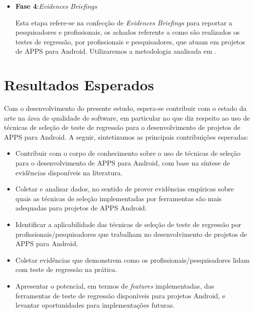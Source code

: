 \begin{itemize}
  \item \textbf{Fase 4}:\textit{Evidences Briefings}
  
  Esta etapa refere-se na confecção de \textit{Evidences Briefings} para reportar a pesquisadores e profissionais, os achados referente a como são realizados os testes de regressão, por profissionais e pesquisadores, que atuam em projetos de \ac{APPS} para Android. Utilizaremos a metodologia analisada em .
  
\end{itemize}

\section{Resultados Esperados}\label{sec:resultadosesperados}
Com o desenvolvimento do presente estudo, espera-se contribuir com o estado da arte na área de qualidade de software, em particular no que diz respeito ao uso de técnicas de seleção de teste de regressão para o desenvolvimento de projetos de \ac{APPS} para Android. A seguir, sintetizamos as principais contribuições esperadas: 

\begin{itemize}

    \item Contribuir com o corpo de conhecimento sobre o uso de técnicas de seleção para o desenvolvimento de \ac{APPS} para Android, com base na síntese de evidências disponíveis na literatura.
    
    \item Coletar e analisar dados, no sentido de prover evidências empíricas sobre quais as técnicas de seleção implementadas por ferramentas são mais adequadas para projetos de \ac{APPS} Android.
    
    \item Identificar a aplicabilidade das técnicas de seleção de teste de regressão por profissionais/pesquisadores que trabalham no desenvolvimento de projetos de \ac{APPS} para Android.
    
    \item Coletar evidências que demonstrem como os profissionais/pesquisadores lidam com teste de regressão na prática.
    
    \item Apresentar o potencial, em termos de \textit{features} implementadas, das ferramentas de teste de regressão disponíveis para projetos Android, e levantar oportunidades para implementações futuras.

\end{itemize}

